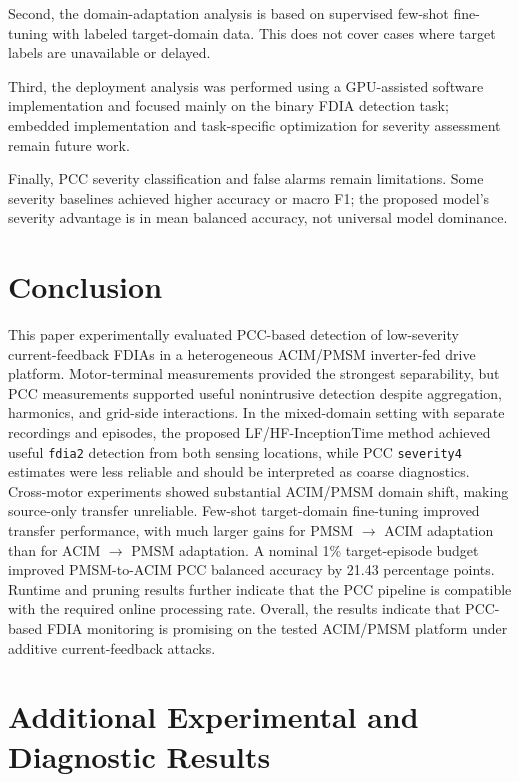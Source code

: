 \documentclass[letterpaper,journal]{IEEEtran}
\begin{document}
Second, the domain-adaptation analysis is based on supervised few-shot fine-tuning with labeled target-domain data. This does not cover cases where target labels are unavailable or delayed.

Third, the deployment analysis was performed using a GPU-assisted software implementation and focused mainly on the binary FDIA detection task; embedded implementation and task-specific optimization for severity assessment remain future work.

Finally, PCC severity classification and false alarms remain limitations. Some severity baselines achieved higher accuracy or macro F1; the proposed model's severity advantage is in mean balanced accuracy, not universal model dominance.

\section{Conclusion}
\label{sec:conclusion}

This paper experimentally evaluated PCC-based detection of low-severity current-feedback FDIAs in a heterogeneous ACIM/PMSM inverter-fed drive platform. Motor-terminal measurements provided the strongest separability, but PCC measurements supported useful nonintrusive detection despite aggregation, harmonics, and grid-side interactions. In the mixed-domain setting with separate recordings and episodes, the proposed LF/HF-InceptionTime method achieved useful \texttt{fdia2} detection from both sensing locations, while PCC \texttt{severity4} estimates were less reliable and should be interpreted as coarse diagnostics. Cross-motor experiments showed substantial ACIM/PMSM domain shift, making source-only transfer unreliable. Few-shot target-domain fine-tuning improved transfer performance, with much larger gains for PMSM $\rightarrow$ ACIM adaptation than for ACIM $\rightarrow$ PMSM adaptation. A nominal 1\% target-episode budget improved PMSM-to-ACIM PCC balanced accuracy by 21.43 percentage points. Runtime and pruning results further indicate that the PCC pipeline is compatible with the required online processing rate. Overall, the results indicate that PCC-based FDIA monitoring is promising on the tested ACIM/PMSM platform under additive current-feedback attacks.




\appendices
\section{Additional Experimental and Diagnostic Results}
\label{app:additional_results}
\end{document}
